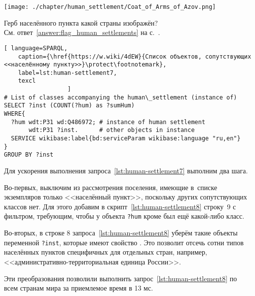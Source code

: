 \begin{marginfigure}[0cm]
{\texttt{[image: ./chapter/human\_settlement/Coat\_of\_Arms\_of\_Azov.png]}}
  \caption[Герб пятого неизвестного населённого пункта.]{Герб населённого пункта какой страны изображён?\\
См. ответ~\ref{answer:flag_human_settlements} на с.~\pageref{answer:flag_human_settlements}.}%
  \label{fig:flag_question_human_settlements5}%
\end{marginfigure}

\begin{lstlisting}[ language=SPARQL, 
    caption={\href{https://w.wiki/4dEW}{Cписок объектов, сопутствующих <<населённому пункту>>}\protect\footnotemark},
    label=lst:human-settlement7,
    texcl 
                  ]
# List of classes accompanying the human\_settlement (instance of)
SELECT ?inst (COUNT(?hum) as ?sumHum) 
WHERE{          
  ?hum wdt:P31 wd:Q486972; # instance of human settlement
       wdt:P31 ?inst.      # other objects in instance
  SERVICE wikibase:label{bd:serviceParam wikibase:language "ru,en"}
}  
GROUP BY ?inst
\end{lstlisting}%

Для ускорения выполнения запроса~\ref{lst:human-settlement7} выполним два шага.
 
Во-первых, выключим из рассмотрения поселения, 
имеющие в~списке экземпляров только <<населённый пункт>>, 
поскольку других сопутствующих классов нет. 
Для этого добавим в скрипт~\ref{lst:human-settlement8} строку~\num{9} с фильтром, 
требующим, чтобы у объекта \lstinline|?hum| 
кроме   был ещё какой-либо класс.

Во-вторых, в строке \num{8} запроса~\ref{lst:human-settlement8} 
уберём такие объекты переменной \lstinline|?inst|, 
которые имеют свойство . 
Это позволит отсечь сотни типов населённых пунктов специфичных для отдельных стран, 
например, <<административно-территориальная единица России>>.

Эти преобразования позволили выполнить запрос~\ref{lst:human-settlement8} 
по всем странам мира за приемлемое время в 13 мс.

